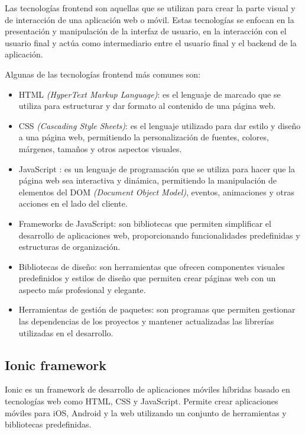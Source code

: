 Las tecnologías frontend son aquellas que se utilizan para crear la parte visual y de interacción de una aplicación web o móvil. Estas tecnologías se enfocan en la presentación y manipulación de la interfaz de usuario, en la interacción con el usuario final y actúa como intermediario entre el usuario final y el backend de la aplicación.

Algunas de las tecnologías frontend más comunes son:
\begin{itemize}
	\item HTML \cite{WEBSITE:HTML} \textit{(HyperText Markup Language)}: es el lenguaje de marcado que se utiliza para estructurar y dar formato al contenido de una página web.
	\item CSS \cite{WEBSITE:css} \textit{(Cascading Style Sheets)}: es el lenguaje utilizado para dar estilo y diseño a una página web, permitiendo la personalización de fuentes, colores, márgenes, tamaños y otros aspectos visuales.
	\item JavaScript \cite{WEBSITE:javascript}: es un lenguaje de programación que se utiliza para hacer que la página web sea interactiva y dinámica, permitiendo la manipulación de elementos del DOM \cite{WEBSITE:DOM} \textit{(Document Object Model)}, eventos, animaciones y otras acciones en el lado del cliente.
	\item Frameworks de JavaScript: son bibliotecas que permiten simplificar el desarrollo de aplicaciones web, proporcionando funcionalidades predefinidas y estructuras de organización.
	\item Bibliotecas de diseño: son herramientas que ofrecen componentes visuales predefinidos y estilos de diseño que permiten crear páginas web con un aspecto más profesional y elegante.
	\item Herramientas de gestión de paquetes: son programas que permiten gestionar las dependencias de los proyectos y mantener actualizadas las librerías utilizadas en el desarrollo.	
\end{itemize}

\subsection{Ionic framework}
\label{subsec:ionic}

Ionic \cite{WEBSITE:ionic} es un framework de desarrollo de aplicaciones móviles híbridas basado en tecnologías web como HTML, CSS y JavaScript. Permite crear aplicaciones móviles para iOS, Android y la web utilizando un conjunto de herramientas y bibliotecas predefinidas.

